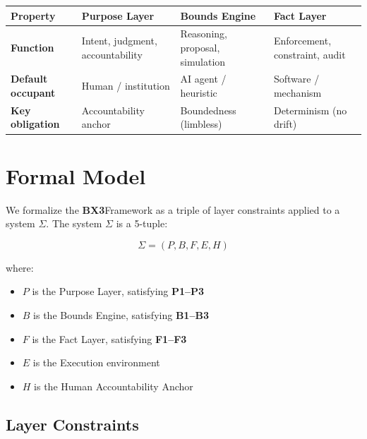 \documentclass[12pt]{article}
\newcommand{\bxthree}{\textbf{BX3}}
\begin{document}
\begin{center}
\begin{tabular}{>{\bfseries}p{2.8cm} p{3.2cm} p{3.2cm} p{4.5cm}}
\toprule
\textbf{Property} & \textbf{Purpose Layer} & \textbf{Bounds Engine} & \textbf{Fact Layer} \\
\midrule
Function & Intent, judgment, accountability & Reasoning, proposal, simulation & Enforcement, constraint, audit \\
Default occupant & Human / institution & AI agent / heuristic & Software / mechanism \\
Key obligation & Accountability anchor & Boundedness (limbless) & Determinism (no drift) \\
\bottomrule
\end{tabular}
\end{center}

\section{Formal Model}
\label{sec:formal}

We formalize the \bxthree Framework as a triple of layer constraints applied to a system $\Sigma$. The system $\Sigma$ is a 5-tuple:

\begin{equation}
\Sigma = (P, B, F, E, H)
\end{equation}

where:
\begin{itemize}
\item $P$ is the Purpose Layer, satisfying \textbf{P1--P3}
\item $B$ is the Bounds Engine, satisfying \textbf{B1--B3}
\item $F$ is the Fact Layer, satisfying \textbf{F1--F3}
\item $E$ is the Execution environment
\item $H$ is the Human Accountability Anchor
\end{itemize}

\subsection{Layer Constraints}
\end{document}
